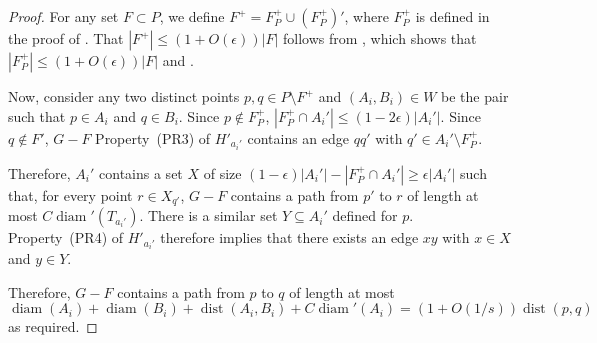 \documentclass{patmorin}
\DeclareMathOperator{\diam}{diam}
\DeclareMathOperator{\dist}{dist}
\begin{document}
\begin{proof}
  For any set $F\subset P$, we define $F^+ = F^+_P \cup (F^+_P)'$, where
  $F^+_P$ is defined in the proof of .  That $|F^+|
  \le (1+O(\epsilon))|F|$ follows from , which
  shows that $|F^+_P|\le (1+O(\epsilon))|F|$ and .

  Now, consider any two distinct points $p,q\in P\setminus F^+$ and
  $(A_i,B_i)\in W$ be the pair such that $p\in A_i$ and $q\in B_i$.
  Since $p\not\in F^+_P$, $|F^+_P\cap A_i'|\le (1-2\epsilon)|A_i'|$.
  Since $q\not\in F'$, $G-F$ Property~(PR3) of $H'_{a_i'}$ contains
  an edge $qq'$ with $q'\in A_i'\setminus F^+_P$.

  Therefore, $A_i'$ contains a set $X$ of size
  $(1-\epsilon)|A_i'|-|F^+_P\cap A_i'|\ge \epsilon|A_i'|$ such that, for
  every point $r\in X_{q'}$, $G-F$ contains a path from $p'$ to $r$ of
  length at most $C\diam'(T_{a_i'})$.  There is a similar set $Y\subseteq
  A_i'$ defined for $p$.  Property~(PR4) of $H'_{a_i'}$ therefore implies
  that there exists an edge $xy$ with $x\in X$ and $y\in Y$.

  Therefore, $G-F$ contains a path from $p$ to $q$ of length at most
  \[  \diam(A_i) + \diam(B_i) + \dist(A_i,B_i) + C\diam'(A_i) = (1+O(1/s))\dist(p,q)
  \]
  as required.
\end{proof}




\end{document}
